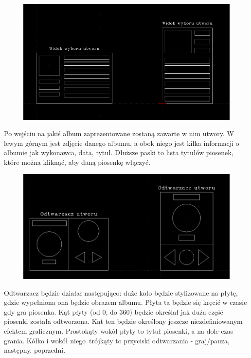 \begin{figure}[H]
	\centering
	\includegraphics[width=1\textwidth]{images/mockup_utwory.png}
	\caption{}
\end{figure}

Po wejściu na jakiś album zaprezentowane zostaną zawarte w nim utwory. W lewym górnym jest zdjęcie danego albumu, a obok niego jest kilka informacji o albumie jak wykonawca, data, tytuł. Dłuższe paski to lista tytułów piosenek, które można kliknąć, aby daną piosenkę włączyć.

\begin{figure}[H]
	\centering
	\includegraphics[width=1\textwidth]{images/mockup_odtwarzacz.png}
	\caption{}
\end{figure}

Odtwarzacz będzie działał następująco: duże koło będzie stylizowane na płytę, gdzie wypełniona ona będzie obrazem albumu. Płyta ta będzie się kręcić w czasie gdy gra piosenka. Kąt płyty (od 0\degree, do 360\degree) będzie określał jak duża część piosenki została odtworzona. Kąt ten będzie określony jeszcze niezdefiniowanym efektem graficznym. Prostokąty wokół płyty to tytuł piosenki, a na dole czas grania. Kółko i wokół niego trójkąty to przyciski odtwarzania - graj/pauza, następny, poprzedni. 

